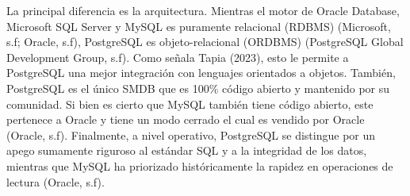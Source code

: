 \item La principal diferencia es la arquitectura. Mientras el motor de Oracle Database, Microsoft SQL Server y MySQL es puramente relacional (RDBMS) (Microsoft, s.f; Oracle, s.f), PostgreSQL es objeto-relacional (ORDBMS) (PostgreSQL Global Development Group, s.f). Como señala Tapia (2023), esto le permite a PostgreSQL una mejor integración con lenguajes orientados a objetos. También, PostgreSQL es el único SMDB que es 100\% código abierto y mantenido por su comunidad. Si bien es cierto que MySQL también tiene código abierto, este pertenece a Oracle y tiene un modo cerrado el cual es vendido por Oracle (Oracle, s.f).
Finalmente, a nivel operativo, PostgreSQL se distingue por un apego sumamente riguroso al estándar SQL y a la integridad de los datos, mientras que MySQL ha priorizado históricamente la rapidez en operaciones de lectura (Oracle, s.f).
